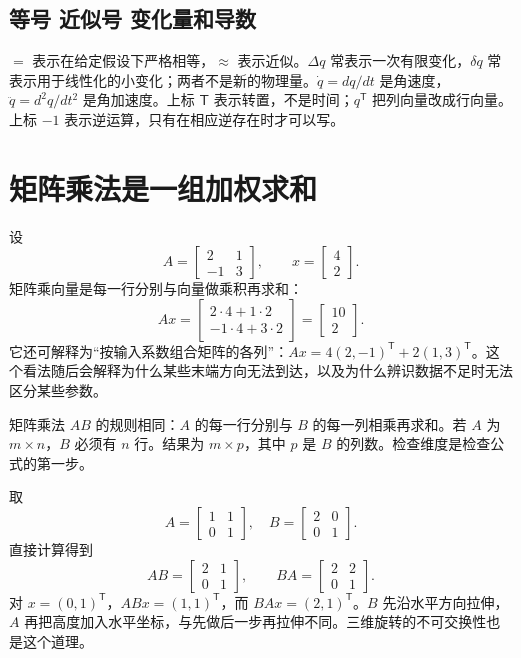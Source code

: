 \subsection{等号 近似号 变化量和导数}
$=$ 表示在给定假设下严格相等，$\approx$ 表示近似。$\Delta q$ 常表示一次有限变化，$\delta q$ 常表示用于线性化的小变化；两者不是新的物理量。$\dot q=dq/dt$ 是角速度，$\ddot q=d^2q/dt^2$ 是角加速度。上标 $\mathsf T$ 表示转置，不是时间；$q^\mathsf T$ 把列向量改成行向量。上标 $-1$ 表示逆运算，只有在相应逆存在时才可以写。

\section{矩阵乘法是一组加权求和}
设
\begin{equation}
 A=\begin{bmatrix}2&1\\-1&3\end{bmatrix},\qquad
 x=\begin{bmatrix}4\\2\end{bmatrix}.
\end{equation}
矩阵乘向量是每一行分别与向量做乘积再求和：
\begin{equation}
 Ax=\begin{bmatrix}2\cdot4+1\cdot2\\-1\cdot4+3\cdot2\end{bmatrix}
 =\begin{bmatrix}10\\2\end{bmatrix}.
\end{equation}
它还可解释为“按输入系数组合矩阵的各列”：$Ax=4(2,-1)^\mathsf T+2(1,3)^\mathsf T$。这个看法随后会解释为什么某些末端方向无法到达，以及为什么辨识数据不足时无法区分某些参数。

矩阵乘法 $AB$ 的规则相同：$A$ 的每一行分别与 $B$ 的每一列相乘再求和。若 $A$ 为 $m\times n$，$B$ 必须有 $n$ 行。结果为 $m\times p$，其中 $p$ 是 $B$ 的列数。检查维度是检查公式的第一步。
\begin{examplebox}[算例 为什么矩阵的先后顺序不能交换]
取
\[
 A=\begin{bmatrix}1&1\\0&1\end{bmatrix},\quad
 B=\begin{bmatrix}2&0\\0&1\end{bmatrix}.
\]
直接计算得到
\[
 AB=\begin{bmatrix}2&1\\0&1\end{bmatrix},\qquad
 BA=\begin{bmatrix}2&2\\0&1\end{bmatrix}.
\]
对 $x=(0,1)^\mathsf T$，$ABx=(1,1)^\mathsf T$，而 $BAx=(2,1)^\mathsf T$。$B$ 先沿水平方向拉伸，$A$ 再把高度加入水平坐标，与先做后一步再拉伸不同。三维旋转的不可交换性也是这个道理。
\end{examplebox}

